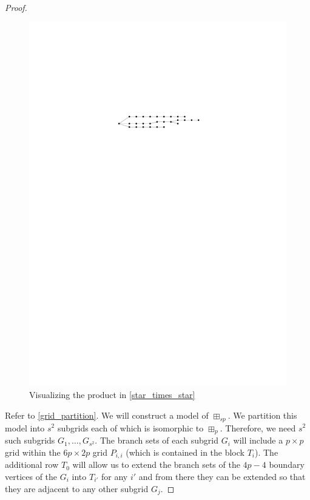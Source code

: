\documentclass{patmorin}
\theoremstyle{plain}
\theoremstyle{definition}
\begin{document}
\begin{proof}
  \begin{figure}[ht]
    \begin{center}
      \includegraphics[page=4]{figs/product}
    \end{center}
    \caption{Visualizing the product in \cref{star_times_star}}
    \label{product_fig}
  \end{figure}

  Refer to \cref{grid_partition}.  We will construct a model of $\boxplus_{sp}$. 
  We partition this model into $s^2$ subgrids each of which is isomorphic to $\boxplus_p$.  Therefore, we need $s^2$ such subgrids $G_1,\ldots,G_{s^2}$. The branch sets of each subgrid $G_i$ will include a $p\times p$ grid within the $6p\times 2p$ grid $P_{i,i}$ (which is contained in the block $T_i$).  The additional row $T_0$ will allow us to extend the branch sets of the $4p-4$ boundary vertices of the $G_i$ into $T_{i'}$ for any $i'$ and from there they can be extended so that they are adjacent to any other subgrid $G_j$.


\end{proof}
\end{document}
